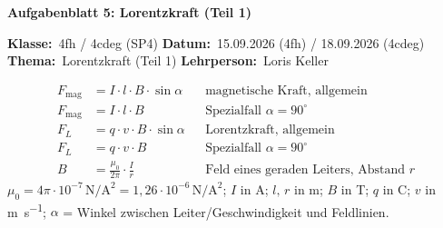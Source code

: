 \documentclass[addpoints,11pt,a4paper]{exam}
\newcommand{\Kopfzeile}[4]{%
  \begin{titlebox}
    {\color{white}\sffamily\bfseries\Large #4}
  \end{titlebox}
  \vspace{0.5em}
  \noindent\textbf{Klasse:}~#1 \hfill \textbf{Datum:}~#2 \hfill \textbf{Thema:}~#3
    \hfill \textbf{Lehrperson:}~Loris Keller
  \vspace{0.8em}
  \lhead{\textcolor{darkgray}{#3}}
  \rhead{\textcolor{darkgray}{#4}}
}
\newcommand{\Klasse}{4fh / 4cdeg (SP4)}
\newcommand{\Datum}{15.09.2026 (4fh) / 18.09.2026 (4cdeg)}
\newcommand{\Thema}{Lorentzkraft (Teil 1)}
\newcommand{\ArbeitsblattTitel}{Aufgabenblatt 5: Lorentzkraft (Teil 1)}
\begin{document}
\Kopfzeile{\Klasse}{\Datum}{\Thema}{\ArbeitsblattTitel}

\begin{formelbox}[Formelsammlung]
\begin{align*}
  F_{\text{mag}} &= I\cdot l\cdot B\cdot\sin\alpha
    &&\text{magnetische Kraft, allgemein}\\
  F_{\text{mag}} &= I\cdot l\cdot B &&\text{Spezialfall } \alpha=90^\circ\\
  F_L &= q\cdot v\cdot B\cdot\sin\alpha &&\text{Lorentzkraft, allgemein}\\
  F_L &= q\cdot v\cdot B &&\text{Spezialfall } \alpha=90^\circ\\
  B &= \frac{\mu_0}{2\pi}\cdot\frac{I}{r} &&\text{Feld eines geraden Leiters, Abstand } r
\end{align*}
$\mu_0=4\pi\cdot10^{-7}\,\si{\newton\per\ampere\squared}=1{,}26\cdot10^{-6}\,\si{\newton\per\ampere\squared}$;
$I$ in \si{\ampere}; $l,\,r$ in \si{\meter}; $B$ in \si{\tesla}; $q$ in
\si{\coulomb}; $v$ in \si{\meter\per\second}; $\alpha$ = Winkel zwischen
Leiter/Geschwindigkeit und Feldlinien.
\end{formelbox}
\end{document}
